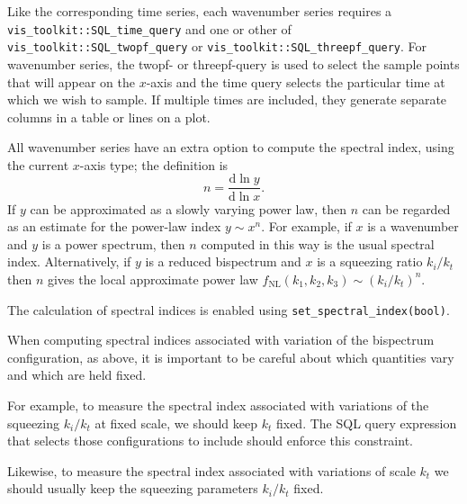 \documentclass[11pt,a4paper]{article}
\newenvironment{warning}{\begin{tcolorbox}[enhanced,breakable,colback=red!10,colbacktitle=red!20,colframe=red!40,coltitle=black,title={Warning},fonttitle=\sffamily\fontseries{b}\selectfont]}{\end{tcolorbox}}
\renewcommand{\d}{\mathrm{d}}
\newcommand{\fNL}{f_{\mathrm{NL}}}
\newcommand{\semibold}[1]{{\fontseries{b}\selectfont{#1}}}
\newcommand{\para}[1]{\par\vspace{2mm}\noindent\semibold{{#1.}---}\ignorespaces}
\begin{document}
Like the corresponding time series, each wavenumber series
requires
a \texttt{vis_toolkit::SQL_time_query}
and one
or other of
\texttt{vis_toolkit::SQL_twopf_query} or
\texttt{vis_toolkit::SQL_threepf_query}.
For wavenumber series, the twopf- or threepf-query is used to select the
sample points that will appear on the $x$-axis
and the time query selects the particular time at which we wish to sample.
If multiple times are included, they generate separate columns in a table
or lines on a plot.

\para{Spectral indices}
All wavenumber series have an extra option to compute the spectral index,
using the current $x$-axis type;
the definition is
\begin{equation}
    n = \frac{\d \ln y}{\d \ln x} .    
\end{equation}
If $y$ can be approximated as a slowly varying power law, then $n$
can be regarded as an estimate for the power-law index
$y \sim x^n$.
For example, if $x$ is a wavenumber and $y$ is a power spectrum, then
$n$ computed in this way is the usual spectral index.
Alternatively, if $y$ is a reduced bispectrum and
$x$ is a squeezing ratio $k_i/k_t$ then
$n$ gives the local approximate power law
$\fNL(k_1, k_2, k_3) \sim (k_i/k_t)^n$.

The calculation of spectral indices is enabled using
\texttt{set_spectral_index(bool)}.

\begin{warning}
    When computing spectral indices associated with variation of the
    bispectrum configuration, as above, it is important to be
    careful about which quantities vary and which are held fixed.

    For example, to measure the spectral index associated with
    variations of the squeezing $k_i/k_t$ at fixed scale, we should keep
    $k_t$ fixed. The SQL query expression that selects those configurations
    to include should enforce this constraint.

    Likewise, to measure the spectral index associated with variations of
    scale $k_t$ we should usually keep the squeezing parameters $k_i/k_t$ fixed.
\end{warning}
\end{document}
